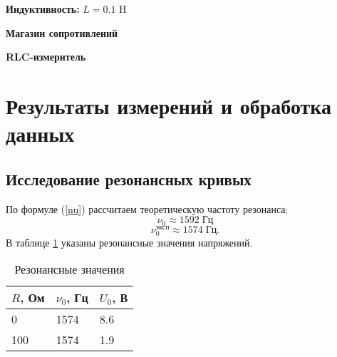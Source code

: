 \documentclass[a4paper]{article}
\newcommand{\rref}[1]{(\ref{#1})}
\newcommand{\equip}[1]{
	
	{\bf #1}
	
}
\begin{document}
{\bf Индуктивность: }$L = 0.1$ \si{\henry}
\equip{Магазин сопротивлений}
\equip{RLC-измеритель}

\section{Результаты измерений и обработка данных}

\subsection{Исследование резонансных кривых}

По формуле \rref{nu} рассчитаем теоретическую частоту резонанса:
\begin{equation}\label{key}
	\nu_0\approx 1592 \; Гц
\end{equation}
\begin{equation}\label{key}
	\nu_0^{эксп} \approx 1574 \; Гц.
\end{equation}
В таблице \ref{res} указаны резонансные значения напряжений.

\begin{table}[]
	\centering
	\begin{tabular}{|l|l|l|}
		\hline
		\textbf{$R$, Ом} & \textbf{$\nu_0$, Гц} & \textbf{$U_0$, В} \\ \hline
		0                & 1574                 & 8.6               \\ \hline
		100              & 1574                 & 1.9               \\ \hline
	\end{tabular}
	\caption{Резонансные значения}
	\label{res}
\end{table}
\end{document}
